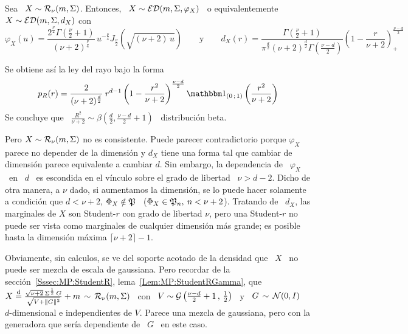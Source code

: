 \begin{ejemplo}
%
  Sea \ $X \sim \mathcal{R}_\nu(m,\Sigma)$.  Entonces, \ $X \sim \mathcal{ED}(m,\Sigma,\varphi_X)$
  \ o equivalentemente \ $X \sim \mathcal{ED}(m,\Sigma,d_X)$ con
  \[
  \varphi_X(u)   =   \frac{2^{\frac{\nu}{2}}   \Gamma\left(   \frac{\nu}{2}   +1
    \right)}{(\nu+2)^{\frac{\nu}{4}}}            \,           u^{-\frac{\nu}{4}}
  J_{\frac{\nu}{2}}\left(  \sqrt{(\nu+2) \,  u} \right)  \qquad  \mbox{y} \qquad
  d_X(r)  =  \frac{\Gamma\left(  \frac{\nu}{2}  +  1  \right)}{\pi^{\frac{d}{2}}
    (\nu+2)^{\frac{d}{2}}  \Gamma\left(  \frac{\nu-d}{2}  \right)}  \left(  1  -
    \frac{r}{\nu+2} \right)_+^{\frac{\nu-d}{2}}
  \]
  
  Se obtiene as\'i la ley del rayo bajo la forma
  \[
  p_R(r)   =    \frac{2}{(\nu+2)^{\frac{d}{2}}}   \:   r^{d-1}    \left(   1   -
    \frac{r^2}{\nu+2}    \right)^{\frac{\nu-d}{2}}    \un_{(0    \;    1)}\left(
    \frac{r^2}{\nu+2} \right)
  \]
  Se  concluye   que  \   $\frac{R^2}{\nu+2}  \sim  \beta\left(   \frac{d}{2}  ,
    \frac{\nu-d}{2}+1 \right)$ \ distribuci\'on beta.

  Pero $X \sim \mathcal{R}_\nu(m,\Sigma)$ no es consistente. Puede parecer contradictorio
  porque  $\varphi_X$ parece no  depender de  la dimensi\'on  y $d_X$  tiene una
  forma tal  que cambiar  de dimensi\'on parece  equivalente a cambiar  $d$. Sin
  embargo, la  dependencia de  \ $\varphi_X$  \ en \  $d$ \  es escondida  en el
  v\'inculo sobre el  grado de libertad \  $\nu > d-2$. Dicho de  otra manera, a
  $\nu$  dado, si  aumentamos  la dimensi\'on,  se  lo puede  hacer solamente  a
  condici\'on que $d < \nu+2$, \ie $\Phi_X \notin \mathfrak{P}$ \ ($\Phi_X \in \mathfrak{P}_n, \:
  n < \nu+2$).   Tratando de \ $d_X$, las marginales de  $X$ son Student-$r$ con
  grado  de  libertad  $\nu$, pero  una  Student-$r$  no  puede ser  vista  como
  marginales  de  cualquier  dimensi\'on  m\'as  grande;  es  posible  hasta  la
  dimensi\'on m\'axima $\lceil \nu+2 \rceil-1$.

  Obviamente, sin calculos, se ve del soporte acotado de la densidad que \ $X$ \
  no  puede   ser  mezcla  de  escala   de  gaussiana.   Pero   recordar  de  la
  secci\'on~\ref{Sssec:MP:StudentR},  lema~\ref{Lem:MP:StudentRGamma}, que  \ $X
  \stackrel{\mathrm{d}}{=} \frac{\sqrt{\nu+2} \: \Sigma^{\frac12} \, G}{\sqrt{V + \|G\|^2}} + m \,
  \sim \, \mathcal{R}_\nu( m , \Sigma )$  \ con \ $V \sim \mathcal{G}\left( \frac{\nu-d}{2}+1 \, ,
    \,  \frac12 \right)$  \  y \  $G \,  \sim  \, \mathcal{N}(0,I)$  \ $d$-dimensional  e
  independientes de $V$.  Parece una mezcla de gaussiana, pero con la generadora
  que ser\'ia dependiente de \ $G$ \ en este caso.
\end{ejemplo}

